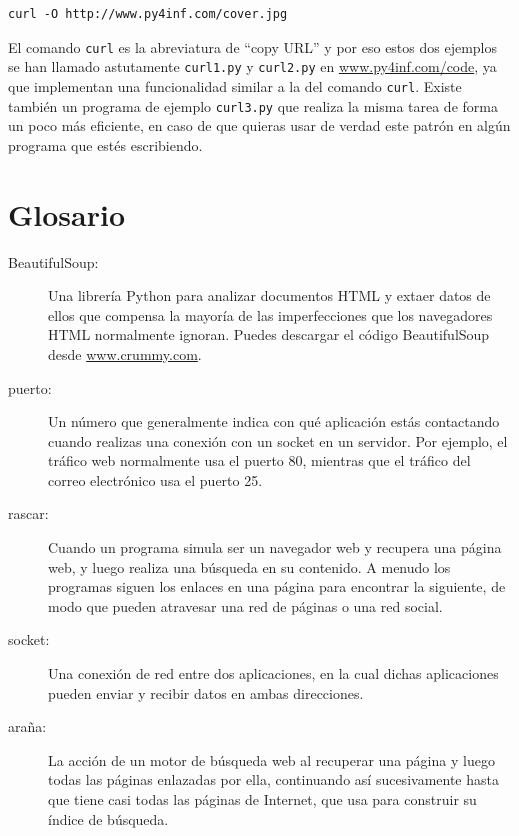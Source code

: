 \beforeverb
\begin{verbatim}
curl -O http://www.py4inf.com/cover.jpg
\end{verbatim}
\afterverb
%
El comando {\tt curl} es la abreviatura de ``copy URL'' y por eso estos dos
ejemplos se han llamado astutamente {\tt curl1.py} y {\tt curl2.py} en
\url{www.py4inf.com/code}, ya que implementan una funcionalidad similar
a la del comando {\tt curl}. Existe también un programa de ejemplo {\tt curl3.py}
que realiza la misma tarea de forma un poco más eficiente, en caso de
que quieras usar de verdad este patrón en algún programa que estés escribiendo.

\section{Glosario}

\begin{description}

\item[BeautifulSoup:] Una librería Python para analizar documentos HTML
y extaer datos de ellos
que compensa la mayoría de las imperfecciones que los navegadores HTML
normalmente ignoran.
Puedes descargar el código BeautifulSoup
desde
\url{www.crummy.com}.

\item[puerto:] Un número que generalmente indica con qué aplicación
estás contactando cuando realizas una conexión con un socket en un servidor.
Por ejemplo, el tráfico web normalmente usa el puerto 80, mientras que el tráfico
del correo electrónico usa el puerto 25.

\item[rascar:] Cuando un programa simula ser un navegador web y
recupera una página web, y luego realiza una búsqueda en su contenido.
A menudo los programas siguen los enlaces en una página para encontrar la
siguiente, de modo que pueden atravesar una red de páginas o una red social.

\item[socket:] Una conexión de red entre dos aplicaciones,
en la cual dichas aplicaciones pueden enviar y recibir datos en ambas direcciones.

\item[araña:] La acción de un motor de búsqueda web al recuperar una página
y luego todas las páginas enlazadas por ella, continuando así sucesivamente hasta que
tiene casi todas las páginas de Internet, que
usa para construir su índice de búsqueda.

\end{description}

